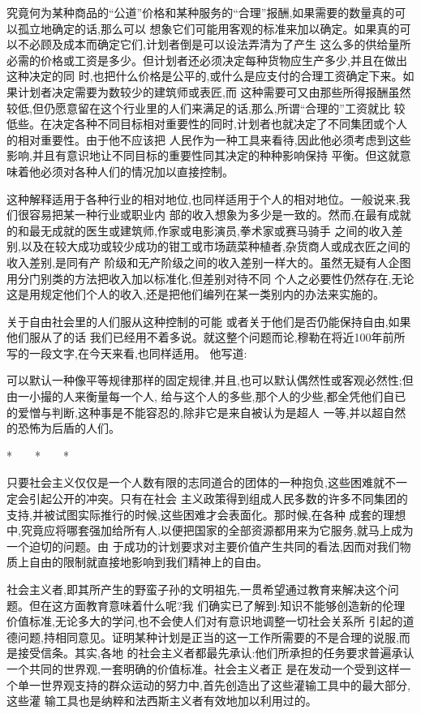 ﻿\documentclass[12pt]{article}
\begin{document}
究竟何为某种商品的``公道''价格和某种服务的``合理''报酬,如果需要的数量真的可以孤立地确定的话,那么可以
想象它们可能用客观的标准来加以确定。如果真的可以不必顾及成本而确定它们,计划者倒是可以设法弄清为了产生
这么多的供给量所必需的价格或工资是多少。但计划者还必须决定每种货物应生产多少,并且在做出这种决定的同
时,也把什么价格是公平的,或什么是应支付的合理工资确定下来。如果计划者决定需要为数较少的建筑师或表匠,而
这种需要可又由那些所得报酬虽然较低,但仍愿意留在这个行业里的人们来满足的话,那么,所谓``合理的''工资就比
较低些。在决定各种不同目标相对重要性的同时,计划者也就决定了不同集团或个人的相对重要性。由于他不应该把
人民作为一种工具来看待,因此他必须考虑到这些影响,并且有意识地让不同目标的重要性同其决定的种种影响保持
平衡。但这就意味着他必须对各种人们的情况加以直接控制。

这种解释适用于各种行业的相对地位,也同样适用于个人的相对地位。一般说来,我们很容易把某一种行业或职业内
部的收入想象为多少是一致的。然而,在最有成就的和最无成就的医生或建筑师,作家或电影演员,拳术家或赛马骑手
之间的收入差别,以及在较大成功或较少成功的钳工或市场蔬菜种植者,杂货商人或成衣匠之间的收入差别,是同有产
阶级和无产阶级之间的收入差别一样大的。虽然无疑有人企图用分门别类的方法把收入加以标准化,但差别对待不同
个人之必要性仍然存在,无论这是用规定他们个人的收入,还是把他们编列在某一类别内的办法来实施的。

关于自由社会里的人们服从这种控制的可能 \myrule 或者关于他们是否仍能保持自由,如果他们服从了的话
\myrule 我们已经用不着多说。就这整个问题而论,穆勒在将近100年前所写的一段文字,在今天来看,也同样适用。
他写道:

可以默认一种像平等规律那样的固定规律,并且,也可以默认偶然性或客观必然性;但由一小撮的人来衡量每一个人,
给与这个人的多些,那个人的少些,都全凭他们自已的爱憎与判断,这种事是不能容忍的,除非它是来自被认为是超人
一等,并以超自然的恐怖为后盾的人们。

*　　*　　*

只要社会主义仅仅是一个人数有限的志同道合的团体的一种抱负,这些困难就不一定会引起公开的冲突。只有在社会
主义政策得到组成人民多数的许多不同集团的支持,并被试图实际推行的时候,这些困难才会表面化。那时候,在各种
成套的理想中,究竟应将哪套强加给所有人,以便把国家的全部资源都用来为它服务,就马上成为一个迫切的问题。由
于成功的计划要求对主要价值产生共同的看法,因而对我们物质上自由的限制就直接地影响到我们精神上的自由。

社会主义者,即其所产生的野蛮子孙的文明祖先,一贯希望通过教育来解决这个问题。但在这方面教育意味着什么呢?我
们确实已了解到:知识不能够创造新的伦理价值标准,无论多大的学问,也不会使人们对有意识地调整一切社会关系所
引起的道德问题,持相同意见。证明某种计划是正当的这一工作所需要的不是合理的说服,而是接受信条。其实,各地
的社会主义者都最先承认:他们所承担的任务要求普遍承认一个共同的世界观,一套明确的价值标准。社会主义者正
是在发动一个受到这样一个单一世界观支持的群众运动的努力中,首先创造出了这些灌输工具中的最大部分,这些灌
输工具也是纳粹和法西斯主义者有效地加以利用过的。
\end{document}
